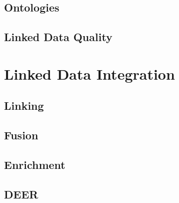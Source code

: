\subsection{Ontologies}
\label{ssec:ontologies}


\subsection{Linked Data Quality}
\label{ssec:ldq}

\newpage
\section{Linked Data Integration}
\label{sec:ldi}


\subsection{Linking}
\label{ssec:linking}


\subsection{Fusion}
\label{ssec:fusion}


\subsection{Enrichment}
\label{ssec:enrichment}


\subsection{\acl{DEER}}
\label{ssec:deer}
